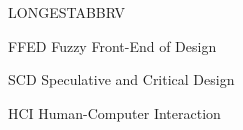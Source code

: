 \begin{theglossary}{LONGESTABBRV}
\item[FFED] Fuzzy Front-End of Design
\item[SCD] Speculative and Critical Design
\item[HCI] Human-Computer Interaction
\end{theglossary}
